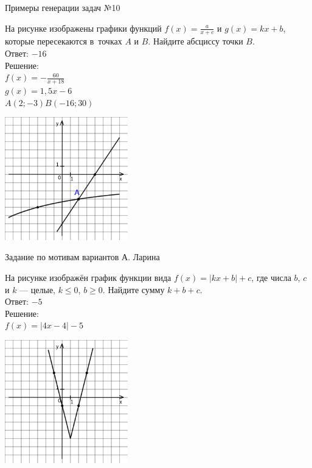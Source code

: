 \documentclass[aspectratio=169,12pt]{beamer}
\begin{document}
\begin{frame}{Примеры генерации задач №10}
    \begin{multicols}{2}
        На рисунке изображены графики функций $f (x)=\frac{a}{x+c}$ и $g (x)=kx+b$, которые пересекаются в~точках $A$ и $B$. Найдите абсциссу точки $B$.\\

        Ответ: $-16$ \\

        Решение: \\
        $f (x)=-\frac{60}{x+18}$\\
        $g (x)=1,5x-6$\\
        $A (2;-3)$\qquad$B (-16;30)$

        \includegraphics[width=0.4\textwidth]{images/17222136364202n0.png}
    \end{multicols}
    

\end{frame}

\begin{frame}{Задание по мотивам вариантов А. Ларина}

    \begin{multicols}{2}
        На рисунке изображён график функции вида $f (x)=|kx+b|+c$, где числа $b$, $c$ и $k$ — целые, $k \leq 0$, $b\geq0$. Найдите сумму $k+b+c$.\\

        Ответ: $-5$\\

        Решение: \\
        $f (x)=|4x-4|-5$

        \includegraphics[width=0.4\textwidth]{images/453912618511153n0.png}
    
    \end{multicols}
\end{frame}
\end{document}
